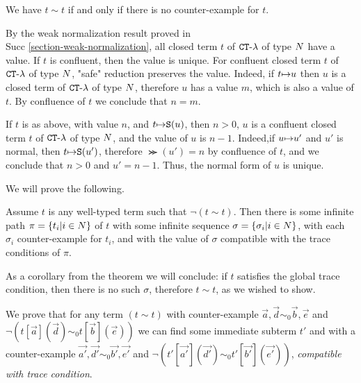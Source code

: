 We have $t \sim t$ if and only if there is no counter-example for $t$.


By the weak normalization result proved in \\Succ  \ref{section-weak-normalization}, all 
closed term $t$ of ${ {\tt CT} \mbox{-} \lambda}$ of type ${N}$ have a value. If $t$ is confluent, then the value is unique.
For confluent closed term $t$ of ${ {\tt CT} \mbox{-} \lambda}$ of type ${N}$, "safe" reduction preserves the value. Indeed,
if $t {\mapsto} u$ then $u$ is a closed term of ${ {\tt CT} \mbox{-} \lambda}$ of type ${N}$, therefore $u$ has a value
$m$, which is also a value of $t$. By confluence of $t$ we conclude that $n=m$.

If $t$ is as above, with value $n$, and $t {\mapsto} {\tt S} (u)$, then $n>0$, 
$u$ is a confluent closed term $t$ of ${ {\tt CT} \mbox{-} \lambda}$ of type ${N}$, and the value of $u$ is $n-1$.
Indeed,if $u {\mapsto} u'$ and $u'$ is normal, then $t {\mapsto} {\tt S} (u')$, therefore $\Succ (u')=n$ 
by confluence of $t$, and we conclude that $n>0$ and $u'=n-1$. Thus, the normal form of $u$ is unique.

We will prove the following.

\begin{theorem}
Assume $t$ is any well-typed term such that $\neg (t \sim t)$. Then there is some infinite path 
$\pi=\{t_i | i \in {N}\}$ of $t$ with some infinite sequence $\sigma= \{\sigma_i| i \in {N}\}$, with
each $\sigma_i$ counter-example for $t_i$, and with the value of $\sigma$ compatible with the
trace conditions of $\pi$.
\end{theorem}

As a corollary from the theorem we will conclude: 
if $t$ satisfies the global trace condition, then there is no such $\sigma$, therefore $t \sim t$, 
as we wished to show.

We prove that for any term $ (t \sim t)$ with counter-example $\vec{a},\vec{d} \sim_0 \vec{b},\vec{e}$
and $\neg (t[\vec{a}](\vec{d}) \sim_0  t[\vec{b}](\vec{e}))$ we can find some immediate
subterm $t'$ and with a counter-example $\vec{a'},\vec{d'} \sim_0 \vec{b'},\vec{e'}$
and $\neg (t'[\vec{a'}](\vec{d'}) \sim_0  t'[\vec{b'}](\vec{e'}))$, \emph{compatible with trace
condition}.


